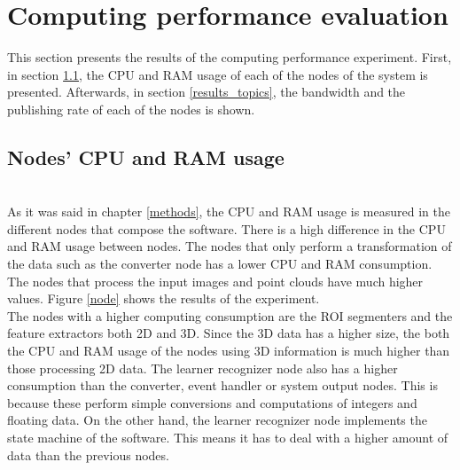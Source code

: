 \section{Computing performance evaluation}
This section presents the results of the computing performance experiment. 
First, in section \ref{results_nodes}, the CPU and RAM usage of each of the nodes of the system is presented. 
Afterwards, in section \ref{results_topics}, the bandwidth and the publishing rate of each of the nodes is shown. 
		\subsection{Nodes' CPU and RAM usage}
		\label{results_nodes}
		\\

			As it was said in chapter \ref{methods}, the CPU and RAM usage is measured in the different nodes that compose the software. 
			There is a high difference in the CPU and RAM usage between nodes.
			The nodes that only perform a transformation of the data such as the converter node has a lower CPU and RAM consumption.
			The nodes that process the input images and point clouds have much higher values. 
			Figure \ref{node} shows the results of the experiment. 
\\

			The nodes with a higher computing consumption are the ROI segmenters and the feature extractors both 2D and 3D. 
			Since the 3D data has a higher size, the both the CPU and RAM usage of the nodes using 3D information is much higher than those processing 2D data. 
			The learner recognizer node also has a higher consumption than the converter, event handler or system output nodes. 
			This is because these perform simple conversions and computations of integers and floating data. 
			On the other hand, the learner recognizer node implements the state machine of the software. 
			This means it has to deal with a higher amount of data than the previous nodes. 
	


